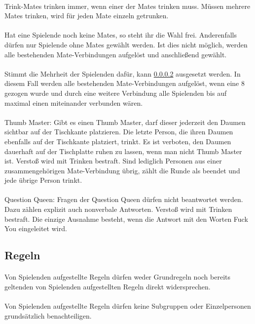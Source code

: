 \paragraph{}
Trink-Mates trinken immer, wenn einer der Mates trinken muss.
Müssen mehrere Mates trinken, wird für jeden Mate einzeln getrunken.

\paragraph{}\label{Ring_of_Fire:Mates}
Hat eine Spielende noch keine Mates, so steht ihr die Wahl frei.
Anderenfalls dürfen nur Spielende ohne Mates gewählt werden.
Ist dies nicht möglich, werden alle bestehenden Mate-Verbindungen aufgelöst und anschließend gewählt.

\paragraph{}
Stimmt die Mehrheit der Spielenden dafür, kann \ref{Ring_of_Fire:Mates} ausgesetzt werden.
In diesem Fall werden alle bestehenden Mate-Verbindungen aufgelöst, wenn eine 8 gezogen wurde und durch eine weitere Verbindung alle Spielenden bis auf maximal einen miteinander verbunden wären.

\paragraph{}
Thumb Master: Gibt es einen Thumb Master, darf dieser jederzeit den Daumen sichtbar auf der Tischkante platzieren.
Die letzte Person, die ihren Daumen ebenfalls auf der Tischkante platziert, trinkt.
Es ist verboten, den Daumen dauerhaft auf der Tischplatte ruhen zu lassen, wenn man nicht Thumb Master ist.
Verstoß wird mit Trinken bestraft.
Sind lediglich Personen aus einer zusammengehörigen Mate-Verbindung übrig, zählt die Runde als beendet und jede übrige Person trinkt.

\paragraph{}
Question Queen: Fragen der Question Queen dürfen nicht beantwortet werden.
Dazu zählen explizit auch nonverbale Antworten. Verstoß wird mit Trinken bestraft.
Die einzige Ausnahme besteht, wenn die Antwort mit den Worten \glqq Fuck You\grqq{} eingeleitet wird.


\subsection{Regeln}
\paragraph{}
Von Spielenden aufgestellte Regeln dürfen weder Grundregeln noch bereits geltenden von Spielenden aufgestellten Regeln direkt widersprechen.

\paragraph{}
Von Spielenden aufgestellte Regeln dürfen keine Subgruppen oder Einzelpersonen grundsätzlich benachteiligen.